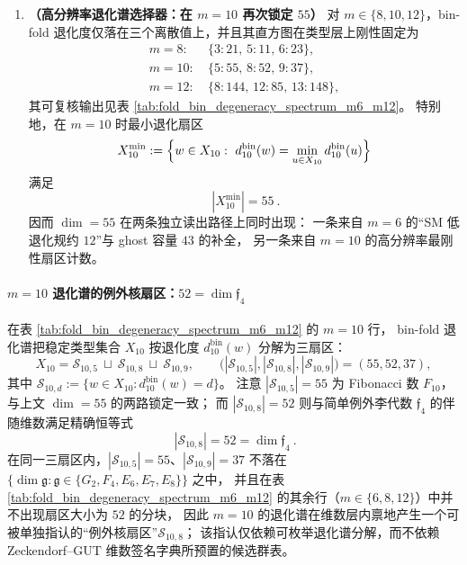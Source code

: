 \begin{enumerate}
  \item \textbf{（高分辨率退化谱选择器：在 \(m=10\) 再次锁定 \(55\)）}
  对 \(m\in\{8,10,12\}\)，bin-fold 退化度仅落在三个离散值上，并且其直方图在类型层上刚性固定为
  \[
  \begin{aligned}
  m=8:\ &\{3:21,\,5:11,\,6:23\},\\
  m=10:\ &\{5:55,\,8:52,\,9:37\},\\
  m=12:\ &\{8:144,\,12:85,\,13:148\},
  \end{aligned}
  \]
  其可复核输出见表 \ref{tab:fold_bin_degeneracy_spectrum_m6_m12}。
  特别地，在 \(m=10\) 时最小退化扇区
  \[
  X^{\min}_{10}:=\Bigl\{w\in X_{10}:\ d^{\mathrm{bin}}_{10}(w)=\min_{u\in X_{10}} d^{\mathrm{bin}}_{10}(u)\Bigr\}
  \]
  满足
  \[
  \boxed{\ |X^{\min}_{10}|=55\ }.
  \]
  因而 \(\dim=55\) 在两条独立读出路径上同时出现：
  一条来自 \(m=6\) 的“SM 低退化规约 \(12\)”与 ghost 容量 \(43\) 的补全，
  另一条来自 \(m=10\) 的高分辨率最刚性扇区计数。
  
\end{enumerate}

\paragraph{\(m=10\) 退化谱的例外核扇区：\texorpdfstring{$52=\dim\mathfrak{f}_4$}{52=dim f4}}\label{par:gut-exceptional-kernel-f4}
在表 \ref{tab:fold_bin_degeneracy_spectrum_m6_m12} 的 \(m=10\) 行，
bin-fold 退化谱把稳定类型集合 \(X_{10}\) 按退化度 \(d^{\mathrm{bin}}_{10}(w)\) 分解为三扇区：
\[
X_{10}=\mathcal{S}_{10,5}\ \sqcup\ \mathcal{S}_{10,8}\ \sqcup\ \mathcal{S}_{10,9},\qquad
\bigl(|\mathcal{S}_{10,5}|,|\mathcal{S}_{10,8}|,|\mathcal{S}_{10,9}|\bigr)=(55,52,37),
\]
其中 \(\mathcal{S}_{10,d}:=\{w\in X_{10}: d^{\mathrm{bin}}_{10}(w)=d\}\)。
注意 \(|\mathcal{S}_{10,5}|=55\) 为 Fibonacci 数 \(F_{10}\)，与上文 \(\dim=55\) 的两路锁定一致；
而 \(|\mathcal{S}_{10,8}|=52\) 则与简单例外李代数 \(\mathfrak{f}_4\) 的伴随维数满足精确恒等式
\[
\boxed{\ |\mathcal{S}_{10,8}|=52=\dim\mathfrak{f}_4\ }.
\]
在同一三扇区内，\(|\mathcal{S}_{10,5}|=55\)、\(|\mathcal{S}_{10,9}|=37\) 不落在
\(\{\dim\mathfrak{g}:\mathfrak{g}\in\{G_2,F_4,E_6,E_7,E_8\}\}\) 之中，
并且在表 \ref{tab:fold_bin_degeneracy_spectrum_m6_m12} 的其余行（\(m\in\{6,8,12\}\)）中并不出现扇区大小为 \(52\) 的分块，
因此 \(m=10\) 的退化谱在维数层内禀地产生一个可被单独指认的“例外核扇区”\(\mathcal{S}_{10,8}\)；
该指认仅依赖可枚举退化谱分解，而不依赖 Zeckendorf--GUT 维数签名字典所预置的候选群表。

